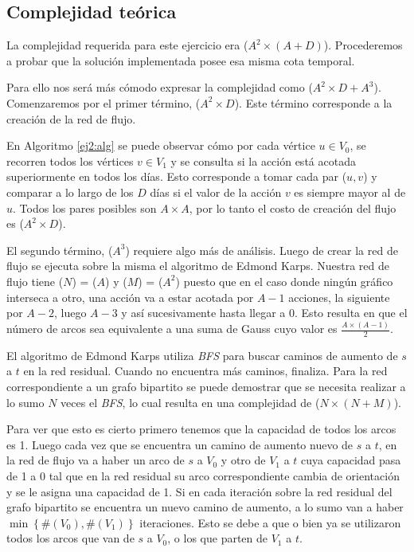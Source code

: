 \subsection{Complejidad teórica}

La complejidad requerida para este ejercicio era \ord($A^2 \times (A + D)$).
Procederemos a probar que la solución implementada posee esa misma cota temporal.

Para ello nos será más cómodo expresar la complejidad como \ord($A^2 \times D +
A^3$). Comenzaremos por el primer término, \ord($A^2 \times D$). Este término
corresponde a la creación de la red de flujo.

En Algoritmo \ref{ej2:alg} se puede observar cómo por cada vértice $u \in V_0$,
se recorren todos los vértices $v \in V_1$ y se consulta si la acción está
acotada superiormente en todos los días. Esto corresponde a tomar cada par ($u,
v$) y comparar a lo largo de los $D$ días si el valor de la acción $v$ es
siempre mayor al de $u$. Todos los pares posibles son $A \times A$, por lo tanto
el costo de creación del flujo es \ord($A^2 \times D$).

El segundo término, \ord($A^3$) requiere algo más de análisis. Luego de crear la
red de flujo se ejecuta sobre la misma el algoritmo de Edmond Karps. Nuestra red
de flujo tiene \ord($N$) = \ord($A$) y \ord($M$) = \ord($A^2$) puesto que en el
caso donde ningún gráfico interseca a otro, una acción va a estar acotada por $A
- 1$ acciones, la siguiente por $A - 2$, luego $A - 3$ y así sucesivamente hasta
llegar a 0. Esto resulta en que el número de arcos sea equivalente a una suma de
Gauss cuyo valor es $\frac{A \times (A - 1)}{2}$.

El algoritmo de Edmond Karps utiliza \emph{BFS} para buscar caminos de aumento
de $s$ a $t$ en la red residual. Cuando no encuentra más caminos, finaliza. Para
la red correspondiente a un grafo bipartito se puede demostrar que
se necesita realizar a lo sumo $N$ veces el \emph{BFS}, lo cual resulta en una
complejidad de \ord($N \times (N + M)$).

Para ver que esto es cierto primero tenemos que la capacidad de todos los arcos
es 1. Luego cada vez que se encuentra un camino de aumento nuevo de $s$ a $t$,
en la red de flujo va a haber un arco de $s$ a $V_0$ y otro de $V_1$ a
$t$ cuya capacidad pasa de 1 a 0 tal que en la red residual su arco
correspondiente cambia de orientación y se le asigna una capacidad de 1. Si en cada iteración
sobre la red residual del grafo bipartito se encuentra un nuevo camino de
aumento, a lo sumo van a haber $\min\left\{\#(V_0), \#(V_1)\right\}$
iteraciones. Esto se debe a que o bien ya se utilizaron todos los arcos que van
de $s$ a $V_0$, o los que parten de $V_1$ a $t$.

